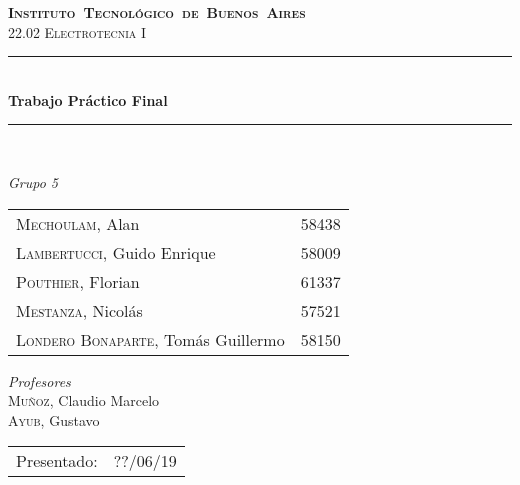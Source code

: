 \begin{titlepage}
\newcommand{\HRule}{\rule{\linewidth}{0.5mm}}
\center
\mbox{\textsc{\LARGE \bfseries {Instituto Tecnológico de Buenos Aires}}}\\[1.5cm]
\textsc{\Large 22.02 Electrotecnia I}\\[0.5cm]


\HRule \\[0.6cm]
{ \Huge \bfseries Trabajo Práctico Final}\\[0.4cm] 
\HRule \\[1.5cm]


{\large

\emph{Grupo 5}\\
\vspace{3px}

\begin{tabular}{lr} 	
\textsc{Mechoulam}, Alan  &  58438\\
\textsc{Lambertucci}, Guido Enrique  & 58009 \\
\textsc{Pouthier}, Florian  & 61337 \\
\textsc{Mestanza}, Nicolás  & 57521 \\
\textsc{Londero Bonaparte}, Tomás Guillermo  & 58150 \\
\end{tabular}

\vspace{20px}

\emph{Profesores}\\
\vspace{3px}
\textsc{Muñoz}, Claudio Marcelo\\ 	
\textsc{Ayub}, Gustavo\\ 	

\vspace{100px}

\begin{tabular}{ll}

Presentado: & ??/06/19\\

\end{tabular}

}

\vfill

\end{titlepage}
